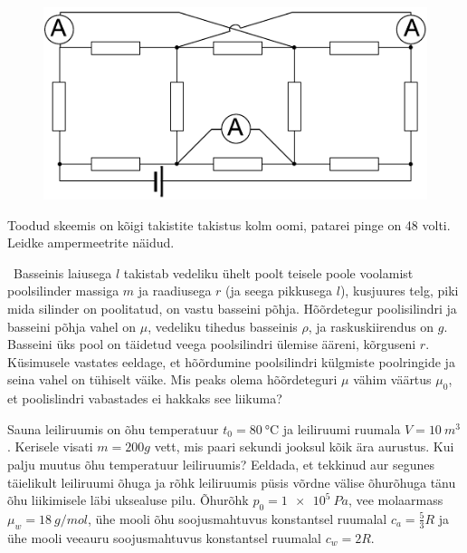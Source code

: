 \documentclass[10pt]{article}
\begin{document}
\setAuthor{}

\begin{figure}
  \vspace{-15pt}
  \begin{center}
  \includegraphics[scale=0.65]{2019-v3g-07-yl.pdf}
  \end{center}
  \vspace{-20pt}
\end{figure}



Toodud skeemis on kõigi takistite takistus kolm oomi, patarei pinge on 48 volti. Leidke ampermeetrite näidud. 
\vspace{25pt}
\probend
\bigskip


\
	Basseinis laiusega $l$ takistab vedeliku ühelt poolt teisele poole voolamist poolsilinder massiga $m$ ja raadiusega $r$ (ja seega pikkusega $l$), kusjuures telg, piki mida silinder on poolitatud, on vastu basseini põhja. Hõõrdetegur poolisilindri ja basseini põhja vahel on $\mu$, vedeliku tihedus basseinis $\rho$, ja raskuskiirendus on $g$. Basseini üks pool on täidetud veega poolsilindri ülemise ääreni, kõrguseni $r$. Küsimusele vastates eeldage, et hõõrdumine poolsilindri külgmiste poolringide ja seina vahel on tühiselt väike. Mis peaks olema hõõrdeteguri $\mu$ vähim väärtus $\mu_0$, et poolislindri vabastades ei hakkaks see liikuma?
\probend
\bigskip

\setAuthor{}

Sauna leiliruumis on õhu temperatuur $t_0=\SI{80}\celsius$ ja leiliruumi ruumala $V=\SI{10}{m^3}$. Kerisele visati $m=\SI{200}g$ vett, mis paari sekundi jooksul kõik ära aurustus. Kui palju muutus õhu temperatuur leiliruumis? Eeldada, et tekkinud aur segunes täielikult leiliruumi õhuga ja rõhk leiliruumis püsis võrdne välise õhurõhuga tänu õhu liikimisele läbi uksealuse pilu. Õhurõhk $p_0=\SI{1e5}{Pa}$, vee molaarmass  $\mu_w=\SI{18}{g/mol}$, ühe mooli õhu soojusmahtuvus konstantsel ruumalal $c_a=\frac 53 R$ ja ühe mooli veeauru soojusmahtuvus konstantsel ruumalal $c_w=2R$.
\probend
\bigskip
\end{document}
